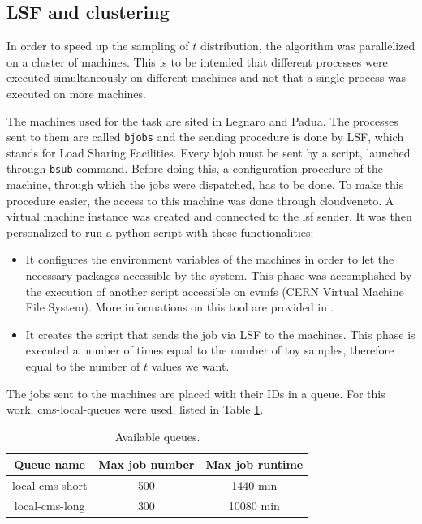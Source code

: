 \subsection{LSF and clustering}
In order to speed up the sampling of $t$ distribution, the algorithm was parallelized on a cluster of machines. This is to be intended that different processes were executed simultaneously on different machines and not that a single process was executed on more machines.

The machines used for the task are sited in Legnaro and Padua. The processes sent to them are called \texttt{bjobs} and the sending procedure is done by LSF, which stands for Load Sharing Facilities. Every bjob must be sent by a script, launched through \texttt{bsub} command. Before doing this, a configuration procedure of the machine, through which the jobs were dispatched, has to be done. To make this procedure easier, the access to this machine was done through cloudveneto. A virtual machine instance was created and connected to the lsf sender. It was then personalized to run a python script with these functionalities:
\begin{itemize}
	\item It configures the environment variables of the machines in order to let the necessary packages accessible by the system. This phase was accomplished by the execution of another script accessible on cvmfs (CERN Virtual Machine File System). More informations on this tool are provided in \cite{cvmfs}.
	\item It creates the script that sends the job via LSF to the machines. This phase is executed a number of times equal to the number of toy samples, therefore equal to the number of $t$ values we want.
\end{itemize}

The jobs sent to the machines are placed with their IDs in a queue. For this work, cms-local-queues were used, listed in Table \ref{tab:QUEUES}.

\begin{table}[H]
	\centering
	\begin{tabular}{c c c}
		\toprule
		Queue name	&	Max job number	&	Max job runtime	\\
		\midrule
		local-cms-short	&	500			&	1440 min		\\
		local-cms-long	&	300			&	10080 min		\\
		\bottomrule
	\end{tabular}
	\caption{Available queues.}
	\label{tab:QUEUES}
\end{table}

